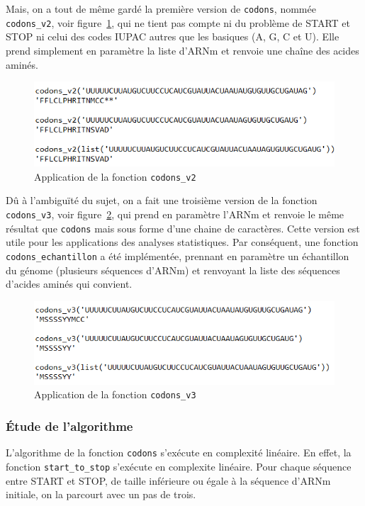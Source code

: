 \documentclass[12pt]{article}
\begin{document}
Mais, on a tout de même gardé la première version de \texttt{codons}, nommée \texttt{codons\_v2}, voir figure~\ref{fig: fctCodonsV2}, qui ne tient pas compte ni du problème de START et STOP ni celui des codes IUPAC autres que les basiques (A, G, C et U). Elle prend simplement en paramètre la liste d'ARNm et renvoie une chaîne des acides aminés. 

     \begin{figure}[!h]
        \centering
        \includegraphics[scale = 1.2]{Images/Codons/app_codons_v2.png}
        \caption{Application de la fonction \texttt{codons\_v2} }
        \label{fig: fctCodonsV2}
    \end{figure}

Dû à l'ambiguïté du sujet, on a fait une troisième version de la fonction \texttt{codons\_v3}, voir figure~\ref{fig: fctCodonsV3}, qui prend en paramètre l'ARNm  et renvoie le même résultat que \texttt{codons} mais sous forme d'une chaine de caractères. Cette version est utile pour les applications des analyses statistiques. Par conséquent, une fonction \texttt{codons\_echantillon} a été implémentée, prennant en paramètre un échantillon du génome (plusieurs séquences d'ARNm) et renvoyant la liste des séquences d'acides aminés qui convient.

     \begin{figure}[!h]
        \centering
        \includegraphics[scale = 1.2]{Images/Codons/app_codons_v3.png}
        \caption{Application de la fonction \texttt{codons\_v3} }
        \label{fig: fctCodonsV3}
    \end{figure}



\subsubsection{Étude de l'algorithme}
L'algorithme de la fonction \texttt{codons} s'exécute en complexité linéaire. En effet, la fonction \texttt{start\_to\_stop} s'exécute en complexite linéaire. Pour chaque séquence entre START et STOP, de taille inférieure ou égale à la séquence d'ARNm initiale, on la parcourt avec un pas de trois.
\end{document}

